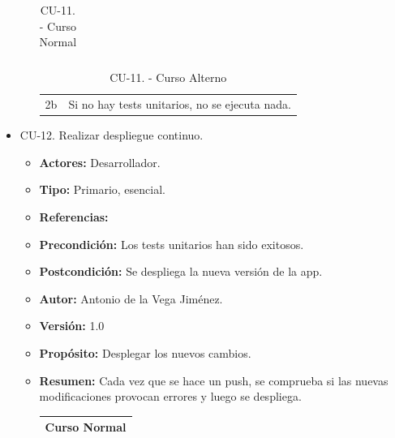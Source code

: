 \begin{itemize}
\begin{itemize}
\begin{table}[H]
\begin{tabularx}{\textwidth}{|l|X|l|X|}
                                  
      \end{tabularx}
      \caption{CU-11. - Curso Normal}
      \label{table-18}
    \end{table}
    \begin{table}[H]
      \centering
      \begin{tabularx}{\textwidth}{|l|X|}
       \hline
       \rowcolor[HTML]{C0C0C0} 
       \multicolumn{2}{|l|}{\cellcolor[HTML]{C0C0C0}Curso Alterno} \\ \hline
       \rowcolor[HTML]{FFFFFF} 
              2b                      & Si no hay tests unitarios, no se ejecuta nada.                            \\ \hline
      \end{tabularx}
      \caption{CU-11. - Curso Alterno}
      \label{table-19}
    \end{table}
  \end{itemize}
\item CU-12. Realizar despliegue continuo.
\begin{itemize}
  \item \textbf{Actores:} Desarrollador.
  \item \textbf{Tipo:} Primario, esencial.
  \item \textbf{Referencias:}
  \item \textbf{Precondición:} Los tests unitarios han sido exitosos.
  \item \textbf{Postcondición:} Se despliega la nueva versión de la app.
  \item \textbf{Autor:} Antonio de la Vega Jiménez.
  \item \textbf{Versión:} 1.0
  \item \textbf{Propósito:} Desplegar los nuevos cambios.
  \item \textbf{Resumen:} Cada vez que se hace un push, se comprueba si las nuevas modificaciones provocan errores y luego se despliega.
  \begin{table}[H]
    \centering
    \begin{tabularx}{\textwidth}{|l|X|l|X|}
      \hline
      \multicolumn{4}{|c|}{\cellcolor[HTML]{C0C0C0}Curso Normal}                                                 \\ \hline

\end{tabularx}
\end{table}
\end{itemize}
\end{itemize}
